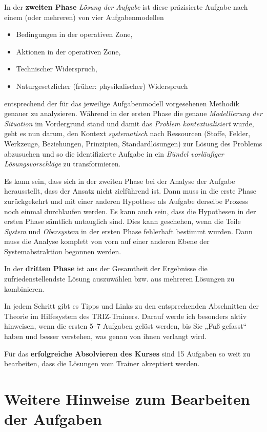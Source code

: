 \documentclass[11pt,a4paper]{article}
\begin{document}
In der \textbf{zweiten Phase} \emph{Lösung der Aufgabe} ist diese präzisierte
Aufgabe nach einem (oder mehreren) von vier Aufgabenmodellen
\begin{itemize}[noitemsep]
\item Bedingungen in der operativen Zone,
\item Aktionen in der operativen Zone, 
\item Technischer Widerspruch,
\item Naturgesetzlicher (früher: physikalischer) Widerspruch
\end{itemize}
entsprechend der für das jeweilige Aufgabenmodell vorgesehenen Methodik
genauer zu analysieren.  Während in der ersten Phase die genaue
\emph{Modellierung der Situation} im Vordergrund stand und damit das
\emph{Problem kontextualisiert} wurde, geht es nun darum, den Kontext
\emph{systematisch} nach Ressourcen (Stoffe, Felder, Werkzeuge, Beziehungen,
Prinzipien, Standardlösungen) zur Lösung des Problems abzusuchen und so die
identifizierte Aufgabe in ein \emph{Bündel vorläufiger Lösungsvorschläge} zu
transformieren.

Es kann sein, dass sich in der zweiten Phase bei der Analyse der Aufgabe
herausstellt, dass der Ansatz nicht zielführend ist. Dann muss in die erste
Phase zurückgekehrt und mit einer anderen Hypothese als Aufgabe derselbe
Prozess noch einmal durchlaufen werden.  Es kann auch sein, dass die
Hypothesen in der ersten Phase sämtlich untauglich sind.  Dies kann geschehen,
wenn die Teile \emph{System} und \emph{Obersystem} in der ersten Phase
fehlerhaft bestimmt wurden. Dann muss die Analyse komplett von vorn auf einer
anderen Ebene der Systemabstraktion begonnen werden.

In der \textbf{dritten Phase} ist aus der Gesamtheit der Ergebnisse die
zufriedenstellendste Lösung auszuwählen bzw.  aus mehreren Lösungen zu
kombinieren.

In jedem Schritt gibt es Tipps und Links zu den entsprechenden Abschnitten der
Theorie im Hilfesystem des TRIZ-Trainers.  Darauf werde ich besonders aktiv
hinweisen, wenn die ersten 5--7 Aufgaben gelöst werden, bis Sie „Fuß gefasst“
haben und besser verstehen, was genau von ihnen verlangt wird.

Für das \textbf{erfolgreiche Absolvieren des Kurses} sind 15 Aufgaben so weit
zu bearbeiten, dass die Lösungen vom Trainer akzeptiert werden.

\section{Weitere Hinweise zum Bearbeiten der Aufgaben}
\end{document}
